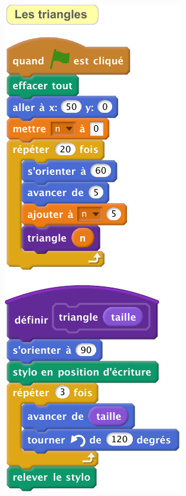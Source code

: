 \documentclass[class=report,crop=false, 12pt]{standalone}
\begin{document}
\begin{code}
{\includegraphics[scale=\scalesolution,scale=0.7]{code-11-ex3b}
}
\end{code}
\end{document}
